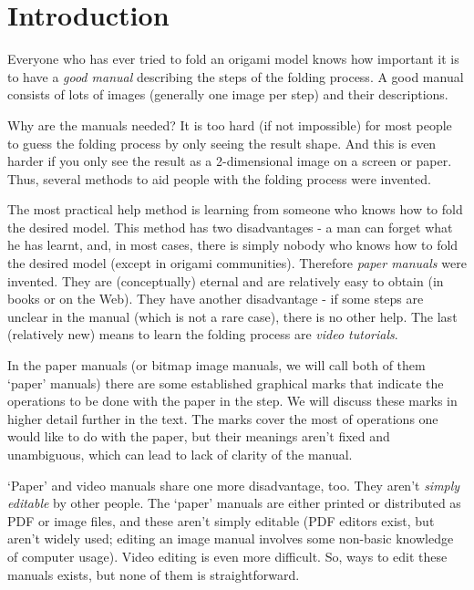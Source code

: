 
\chapter*{Introduction}

Everyone who has ever tried to fold an origami model knows how important it is to have a \emph{good manual} describing the steps of the folding process. A good manual consists of lots of images (generally one image per step) and their descriptions. 

Why are the manuals needed? It is too hard (if not impossible) for most people to guess the folding process by only seeing the result shape. And this is even harder if you only see the result as a 2-dimensional image on a screen or paper. Thus, several methods to aid people with the folding process were invented.

The most practical help method is learning from someone who knows how to fold the desired model. This method has two disadvantages - a man can forget what he has learnt, and, in most cases, there is simply nobody who knows how to fold the desired model (except in origami communities). Therefore \emph{paper manuals} were invented. They are (conceptually) eternal and are relatively easy to obtain (in books or on the Web). They have another disadvantage - if some steps are unclear in the manual (which is not a rare case), there is no other help. The last (relatively new) means to learn the folding process are \emph{video tutorials}.

In the paper manuals (or bitmap image manuals, we will call both of them `paper' manuals) there are some established graphical marks that indicate the operations to be done with the paper in the step. We will discuss these marks in higher detail further in the text. The marks cover the most of operations one would like to do with the paper, but their meanings aren't fixed and unambiguous, which can lead to lack of clarity of the manual.

`Paper' and video manuals share one more disadvantage, too. They aren't \emph{simply editable} by other people. The `paper' manuals are either printed or distributed as PDF or image files, and these aren't simply editable (PDF editors exist, but aren't widely used; editing an image manual involves some non-basic knowledge of computer usage). Video editing is even more difficult. So, ways to edit these manuals exists, but none of them is straightforward.

